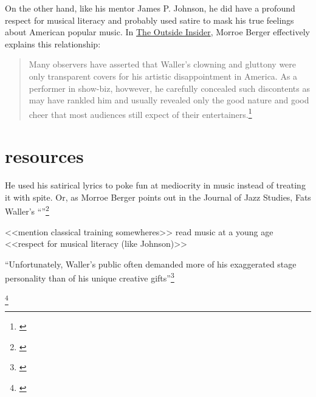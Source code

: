 \documentclass[11pt]{report}
\begin{document}
	\label{sec:respect}
	
	On the other hand, like his mentor James P. Johnson, he did have a profound respect for musical literacy and probably used satire to mask his true feelings about American popular music. In \underline{The Outside Insider}, Morroe Berger effectively explains this relationship:
	\begin{quote}
		Many observers have asserted that Waller's clowning and gluttony were only transparent covers for his artistic disappointment in America. As a performer in show-biz, hovwever, he carefully concealed such discontents as may have rankled him and usually revealed only the good nature and good cheer that most audiences still expect of their entertainers.\footnote{\cite[4]{outside-insider}}
	\end{quote}




	\section{resources}

	He used his satirical lyrics to poke fun at mediocrity in music instead of treating it with spite. Or, as Morroe Berger points out in the Journal of Jazz Studies, Fats Waller's ``''\footnote{\cite[4]{outside-insider}}

	<<mention classical training somewheres>>
	read music at a young age
	<<respect for musical literacy (like Johnson)>>\cite{life}


	``Unfortunately, Waller's public often demanded more of his exaggerated stage personality than of his unique creative gifts''\footnote{\cite[40]{grove-book:waller}}


	\footnote{\cite{youtube-joint_is_jumpin}}


\end{document}
